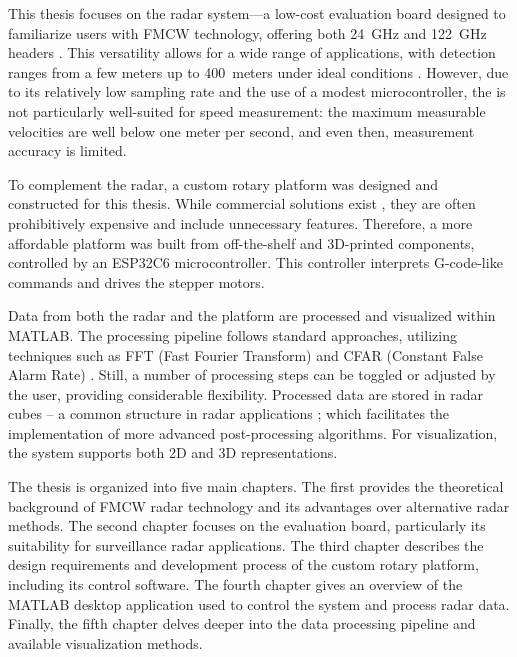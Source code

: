This thesis focuses on the \sidar radar system—a low-cost evaluation board designed to familiarize users with FMCW technology, offering both 24~GHz and 122~GHz headers \cite{sidarMAN}.
This versatility allows for a wide range of applications, with detection ranges from a few meters up to 400~meters under ideal conditions \cite{sidarMANOld}.
However, due to its relatively low sampling rate and the use of a modest microcontroller, the \sidar is not particularly well-suited for speed measurement: the maximum measurable velocities are well below one meter per second, and even then, measurement accuracy is limited.

To complement the radar, a custom rotary platform was designed and constructed for this thesis.
While commercial solutions exist \cite{standa, carl}, they are often prohibitively expensive and include unnecessary features.
Therefore, a more affordable platform was built from off-the-shelf and 3D-printed components, controlled by an ESP32C6 microcontroller.
This controller interprets G-code-like commands and drives the stepper motors.

Data from both the radar and the platform are processed and visualized within MATLAB.
The processing pipeline follows standard approaches, utilizing techniques such as FFT (Fast Fourier Transform) and CFAR (Constant False Alarm Rate) \cite{richards2022}.
Still, a number of processing steps can be toggled or adjusted by the user, providing considerable flexibility.
Processed data are stored in radar cubes -- a common structure in radar applications \cite{richards2022}; which facilitates the implementation of more advanced post-processing algorithms.
For visualization, the system supports both 2D and 3D representations.

The thesis is organized into five main chapters.
The first provides the theoretical background of FMCW radar technology and its advantages over alternative radar methods.
The second chapter focuses on the \sidar evaluation board, particularly its suitability for surveillance radar applications.
The third chapter describes the design requirements and development process of the custom rotary platform, including its control software.
The fourth chapter gives an overview of the MATLAB desktop application used to control the system and process radar data.
Finally, the fifth chapter delves deeper into the data processing pipeline and available visualization methods.
